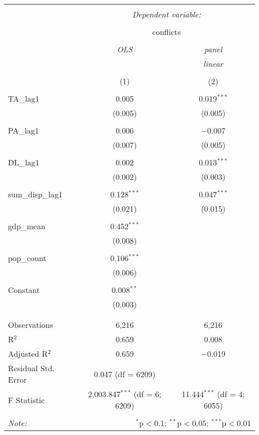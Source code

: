 
\begin{table}[!htbp] \centering 
  \caption{} 
  \label{} 
\begin{tabular}{@{\extracolsep{5pt}}lcc} 
\\[-1.8ex]\hline 
\hline \\[-1.8ex] 
 & \multicolumn{2}{c}{\textit{Dependent variable:}} \\ 
\cline{2-3} 
\\[-1.8ex] & \multicolumn{2}{c}{conflicts} \\ 
\\[-1.8ex] & \textit{OLS} & \textit{panel} \\ 
 & \textit{} & \textit{linear} \\ 
\\[-1.8ex] & (1) & (2)\\ 
\hline \\[-1.8ex] 
 TA\_lag1 & 0.005 & 0.019$^{***}$ \\ 
  & (0.005) & (0.005) \\ 
  & & \\ 
 PA\_lag1 & 0.006 & $-$0.007 \\ 
  & (0.007) & (0.005) \\ 
  & & \\ 
 DL\_lag1 & 0.002 & 0.013$^{***}$ \\ 
  & (0.002) & (0.003) \\ 
  & & \\ 
 sum\_disp\_lag1 & 0.128$^{***}$ & 0.047$^{***}$ \\ 
  & (0.021) & (0.015) \\ 
  & & \\ 
 gdp\_mean & 0.452$^{***}$ &  \\ 
  & (0.008) &  \\ 
  & & \\ 
 pop\_count & 0.106$^{***}$ &  \\ 
  & (0.006) &  \\ 
  & & \\ 
 Constant & 0.008$^{**}$ &  \\ 
  & (0.003) &  \\ 
  & & \\ 
\hline \\[-1.8ex] 
Observations & 6,216 & 6,216 \\ 
R$^{2}$ & 0.659 & 0.008 \\ 
Adjusted R$^{2}$ & 0.659 & $-$0.019 \\ 
Residual Std. Error & 0.047 (df = 6209) &  \\ 
F Statistic & 2,003.847$^{***}$ (df = 6; 6209) & 11.444$^{***}$ (df = 4; 6055) \\ 
\hline 
\hline \\[-1.8ex] 
\textit{Note:}  & \multicolumn{2}{r}{$^{*}$p$<$0.1; $^{**}$p$<$0.05; $^{***}$p$<$0.01} \\ 
\end{tabular} 
\end{table} 
